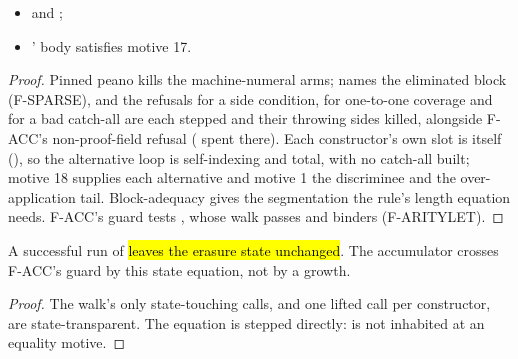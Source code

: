 \begin{lemma}
\label{lem:step_visitCases}
\leanok
{}
\begin{itemize}
\item {}  and ;
\item {} ' body satisfies motive 17.
\end{itemize}
\end{lemma}
\begin{proof}
\leanok
{}
 Pinned peano  kills the machine-numeral arms;  names the
eliminated block (F-SPARSE), and the refusals for a side condition, for one-to-one coverage and for a
bad catch-all are each stepped and their throwing sides killed, alongside F-ACC's non-proof-field
refusal ( spent there). Each constructor's own  slot is itself
(), so the alternative loop is self-indexing and total, with no catch-all
built; motive 18 supplies each alternative and motive 1 the discriminee and the over-application tail.
Block-adequacy gives the segmentation the  rule's length equation needs. F-ACC's guard tests
, whose walk passes  and  binders (F-ARITYLET).
\end{proof}

\begin{lemma}
\label{lem:run_firstNonProofField_state}
\leanok
{}
 A successful run of  \hl{leaves the erasure state
unchanged}.
 The accumulator crosses F-ACC's guard by this state equation, not by a growth.
\end{lemma}
\begin{proof}
\leanok
{} The walk's only state-touching calls,  and one lifted  call per
constructor, are state-transparent. The equation is stepped directly:  is not inhabited
at an equality motive.
\end{proof}

